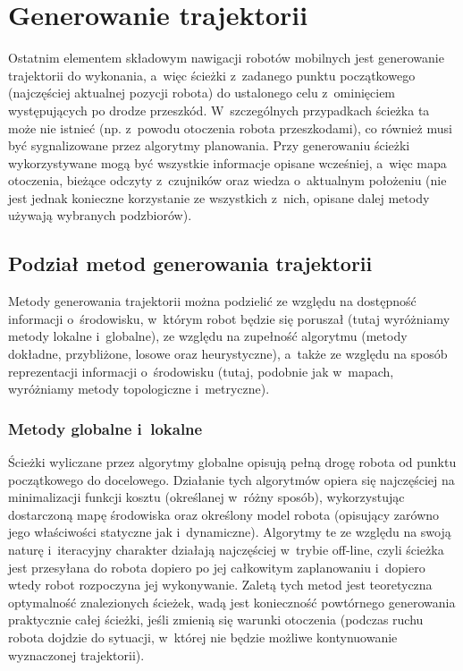 \section{Generowanie trajektorii}

Ostatnim elementem składowym nawigacji robotów mobilnych jest generowanie trajektorii
do wykonania, a~więc ścieżki z~zadanego punktu początkowego (najczęściej aktualnej
pozycji robota) do ustalonego celu z~ominięciem występujących po drodze przeszkód.
W~szczególnych przypadkach ścieżka ta może nie istnieć (np. z~powodu otoczenia robota
przeszkodami), co również musi być sygnalizowane przez algorytmy planowania.
Przy generowaniu ścieżki wykorzystywane mogą być wszystkie informacje opisane wcześniej,
a~więc mapa otoczenia, bieżące odczyty z~czujników oraz wiedza o~aktualnym położeniu
(nie jest jednak konieczne korzystanie ze wszystkich z~nich, opisane dalej metody
używają wybranych podzbiorów).

\subsection{Podział metod generowania trajektorii}

Metody generowania trajektorii można podzielić ze względu na dostępność informacji
o~środowisku, w~którym robot będzie się poruszał (tutaj wyróżniamy metody lokalne
i~globalne), ze względu na zupełność algorytmu (metody dokładne, przybliżone, losowe
oraz heurystyczne), a~także ze względu na sposób reprezentacji informacji o~środowisku
(tutaj, podobnie jak w~mapach, wyróżniamy metody topologiczne i~metryczne).

\subsubsection{Metody globalne i~lokalne}

Ścieżki wyliczane przez algorytmy globalne opisują pełną drogę robota od punktu początkowego
do docelowego. Działanie tych algorytmów opiera się najczęściej na minimalizacji
funkcji kosztu (określanej w~różny sposób), wykorzystując dostarczoną mapę środowiska
oraz określony model robota (opisujący zarówno jego właściwości statyczne jak i~dynamiczne).
Algorytmy te ze względu na swoją naturę i~iteracyjny charakter działają najczęściej
w~trybie off-line, czyli ścieżka jest przesyłana do robota dopiero po jej całkowitym
zaplanowaniu i~dopiero wtedy robot rozpoczyna jej wykonywanie. Zaletą tych metod
jest teoretyczna optymalność znalezionych ścieżek, wadą jest konieczność powtórnego generowania
praktycznie całej ścieżki, jeśli zmienią się warunki otoczenia (podczas ruchu robota
dojdzie do sytuacji, w~której nie będzie możliwe kontynuowanie wyznaczonej trajektorii).

